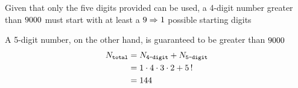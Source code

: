 
\watchout

\ifprintanswers
\fi 

\begin{solution}[\mcq]
	Given that only the five digits provided can be used, a 4-digit number greater than $9000$ must start 
  with at least a $9 \Rightarrow 1$ possible starting digits

	A 5-digit number, on the other hand, is guaranteed to be greater than $9000$
	\begin{align}
		N_{\texttt{total}} &= N_{\texttt{4-digit}} + N_{\texttt{5-digit}} \\
		   &= 1\cdot 4\cdot 3 \cdot 2 + 5\,! \\
		   &= 144
	\end{align}
\end{solution}
